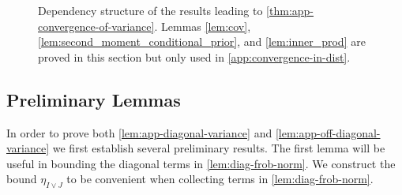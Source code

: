 \documentclass[twoside]{article}
\theoremstyle{theoremstyle}
\begin{document}
\begin{figure}[t]
	\caption{Dependency structure of the results leading to  \cref{thm:app-convergence-of-variance}. Lemmas \ref{lem:cov}, \ref{lem:second_moment_conditional_prior}, and \ref{lem:inner_prod} are proved in this section but only used in \cref{app:convergence-in-dist}.}
	\label{fig:dag-variance}
\end{figure}



\subsection{Preliminary Lemmas}

In order to prove both \cref{lem:app-diagonal-variance} and \cref{lem:app-off-diagonal-variance} we first establish several preliminary results. The first lemma will be useful in bounding the diagonal terms in \cref{lem:diag-frob-norm}. We construct the bound $\eta_{I \lor J}$ to be convenient when collecting terms in \cref{lem:diag-frob-norm}.
\end{document}
